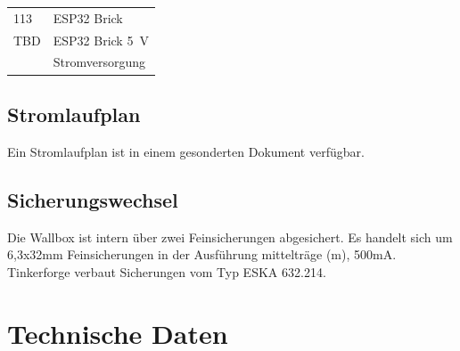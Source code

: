 \documentclass[a4paper,10pt]{article}
\begin{document}
\begin{multicols*}{2}
\begin{tabular}{ll}
		113                                                                                                                      & ESP32 Brick                                           \\
		TBD                                                                                                                      & ESP32 Brick \SI{5}{\volt}                             \\
		                                                                                                                         & Stromversorgung                                       \\
		\bottomrule
	\end{tabular}

	\subsection{Stromlaufplan}
	Ein Stromlaufplan ist in einem gesonderten Dokument verfügbar.

	\subsection{Sicherungswechsel}
	Die Wallbox ist intern über zwei Feinsicherungen abgesichert. Es handelt
	sich um 6,3x32mm Feinsicherungen in der Ausführung mittelträge (m), 500mA.
	Tinkerforge verbaut Sicherungen vom Typ \glqq ESKA  632.214\grqq.

	\section{Technische Daten}

	\begin{minipage}{\linewidth}


\end{minipage}
\end{multicols*}
\end{document}
